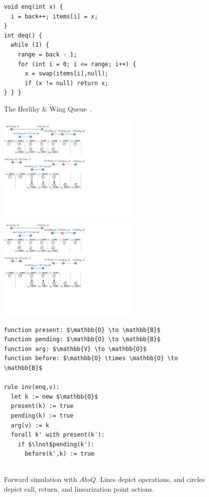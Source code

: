 \begin{figure}[t]
  \begin{minipage}[b]{0.55\linewidth}
    \begin{lstlisting}
void enq(int x) {
  i = back++; items[i] = x;
}
int deq() {
  while (1) {
    range = back - 1;
    for (int i = 0; i <= range; i++) {
      x = swap(items[i],null);
      if (x != null) return x;
} } }
    \end{lstlisting}
    \caption{The Herlihy \& Wing Queue~\cite{journals/toplas/HerlihyW90}.}
    \label{fig:HerlihyWing}
    \vspace{1em}

    \includegraphics[width=7cm]{fig-queue1}
    \includegraphics[width=7cm]{fig-queue2}
    \caption{Forward simulation with $AbsQ$. Lines depict operations,
    and circles depict call, return, and linearization point actions.}
    \label{fig:queueSim}
  \end{minipage}
  \hfill
  \begin{minipage}[b]{0.4\linewidth}
    \begin{lstlisting}
function present: $\mathbb{O} \to \mathbb{B}$
function pending: $\mathbb{O} \to \mathbb{B}$
function arg: $\mathbb{V} \to \mathbb{O}$
function before: $\mathbb{O} \times \mathbb{O} \to \mathbb{B}$

rule inv(enq,v):
  let k := new $\mathbb{O}$
  present(k) := true
  pending(k) := true
  arg(v) := k
  forall k' with present(k'):
    if $\lnot$pending(k'):
      before(k',k) := true


\end{lstlisting}
\end{minipage}
\end{figure}
